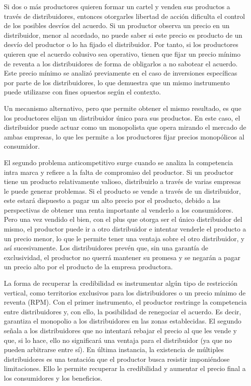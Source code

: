 \documentclass[
  12pt,
  spanish,
]{book}
\begin{document}
Si dos o más productores quieren formar un cartel y venden sus productos
a través de distribuidores, entonces otorgarles libertad de acción
dificulta el control de los posibles desvíos del acuerdo. Si un
productor observa un precio en un distribuidor, menor al acordado, no
puede saber si este precio es producto de un desvío del productor o lo
ha fijado el distribuidor. Por tanto, si los productores quieren que el
acuerdo colusivo sea operativo, tienen que fijar un precio mínimo de
reventa a los distribuidores de forma de obligarlos a no sabotear el
acuerdo. Este precio mínimo se analizó previamente en el caso de
inversiones específicas por parte de los distribuidores, lo que
demuestra que un mismo instrumento puede utilizarse con fines opuestos
según el contexto.

Un mecanismo alternativo, pero que permite obtener el mismo resultado,
es que los productores elijan un distribuidor único para sus productos.
En este caso, el distribuidor puede actuar como un monopolista que opera
mirando el mercado de ambas empresas, lo que les permite a los
productores fijar precios monopólicos al consumidor.

El segundo problema anticompetitivo surge cuando se analiza la
competencia intra marca y refiere a la falta de compromiso del
productor. Si un productor tiene un producto relativamente valioso,
distribuirlo a través de varias empresas le puede generar problemas. Si
el producto se vende a través de un distribuidor, este estará dispuesto
a pagar un alto precio por el producto, debido a las perspectivas de
obtener una renta importante al venderlo a los consumidores. Pero una
vez vendido el bien, con el plus que otorga ser el único distribuidor
del mismo, el productor puede ir a otro distribuidor e intentar venderle
el producto a un precio menor, lo que le permite tener una ventaja sobre
el otro distribuidor, y así sucesivamente. Los distribuidores prevén
que, sin una garantía de exclusividad, el productor no querrá mantener
su promesa y se negarán a pagar un precio alto por el producto de la
empresa productora.

La forma de recuperar la credibilidad es instrumentar algún tipo de
restricción vertical, como territorios exclusivos para los
distribuidores o un precio mínimo de reventa (RPM). Con el primer
instrumento, el productor restringe la competencia entre distribuidores
y, con ello, la posibilidad de renegociar el acuerdo. Es decir,
garantiza el monopolio a los distribuidores en las zonas establecidas.
El segundo señala a los distribuidores que no intentará rebajar el
precio al que les vende y que, si lo hace, ello no significará una
ventaja para el distribuidor (ya que no pueden arbitrarse entre sí). En
última instancia, la existencia de múltiples distribuidores es una
tentación que el productor busca resistir imponiéndose limitaciones.
Ello le permite recuperar la credibilidad y aumentar el precio final a
los consumidores y los beneficios.
\end{document}

